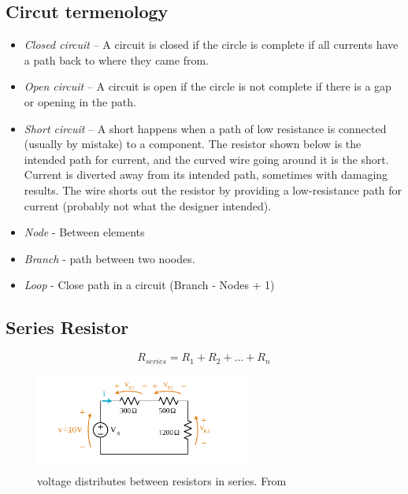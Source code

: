 \subsection{Circut termenology}
\begin{itemize}
    \item \textit{Closed circuit} – A circuit is closed if the circle is complete if all currents have a path back to where they came from.
    \item \textit{Open circuit} – A circuit is open if the circle is not complete if there is a gap or opening in the path.
    \item \textit{Short circuit} – A short happens when a path of low resistance is connected (usually by mistake) to a component. The resistor shown below is the intended path for current, and the curved wire going around it is the short. Current is diverted away from its intended path, sometimes with damaging results. The wire shorts out the resistor by providing a low-resistance path for current (probably not what the designer intended).
    \item \textit{Node} - Between elements
    \item \textit{Branch} - path between two noodes.
    \item \textit{Loop} - Close path in a circuit  (Branch - Nodes + 1)
\end{itemize}

\subsection{Series Resistor}
\begin{equation} R_{series} = R_1 + R_2 + \ldots + R_n \end{equation}

\begin{figure}[h]
    \vspace{10mm}
    \centering
    \includegraphics[width=7cm]{image/voltage-distributes-between-resistors-in-series.png}
    \caption{voltage distributes between resistors in series. From \cite{}}
\end{figure}


